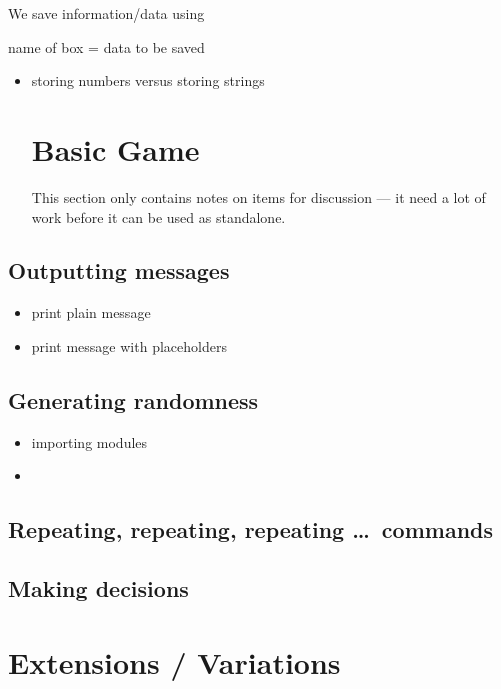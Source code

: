\documentclass{coderdojo}
\begin{document}
We save information/data using

name of box = data to be saved

\begin{itemize}
\item
storing numbers versus storing strings


\section{Basic Game}

This section only contains notes on items for discussion --- it need a lot of work before it can be used as standalone.


\end{itemize}

\subsection{Outputting messages}\label{sec:Output}

\begin{itemize}
\item
print plain message
\item print message with  placeholders
\end{itemize}


\subsection{Generating randomness}\label{sec:Random}

\begin{itemize}
\item
importing modules
\item
{}
\end{itemize}

\subsection{Repeating, repeating, repeating \ldots\ commands}\label{sec:For}
\subsection{Making decisions}\label{sec:If}

\WeAreDone

\clearpage

\section{Extensions / Variations}
\end{document}
